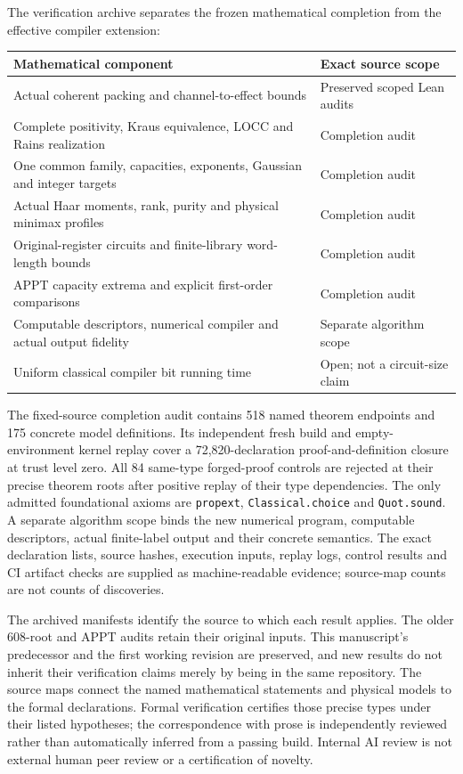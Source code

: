 The verification archive separates the frozen mathematical completion from the effective compiler extension:
\begingroup
\renewcommand{\baselinestretch}{1.0}\small
\begin{center}
\begin{tabular}{>{\raggedright\arraybackslash}p{}>{\raggedright\arraybackslash}p{}}
\toprule
Mathematical component & Exact source scope\\
\midrule
Actual coherent packing and channel-to-effect bounds & Preserved scoped Lean audits\\
Complete positivity, Kraus equivalence, LOCC and Rains realization & Completion audit\\
One common family, capacities, exponents, Gaussian and integer targets & Completion audit\\
Actual Haar moments, rank, purity and physical minimax profiles & Completion audit\\
Original-register circuits and finite-library word-length bounds & Completion audit\\
APPT capacity extrema and explicit first-order comparisons & Completion audit\\
Computable descriptors, numerical compiler and actual output fidelity & Separate algorithm scope\\
Uniform classical compiler bit running time & Open; not a circuit-size claim\\
\bottomrule
\end{tabular}
\end{center}
\endgroup
The fixed-source completion audit contains 518 named theorem endpoints and 175 concrete model definitions. Its independent fresh build and empty-environment kernel replay cover a 72,820-declaration proof-and-definition closure at trust level zero. All 84 same-type forged-proof controls are rejected at their precise theorem roots after positive replay of their type dependencies. The only admitted foundational axioms are \texttt{propext}, \texttt{Classical.choice} and \texttt{Quot.sound}. A separate algorithm scope binds the new numerical program, computable descriptors, actual finite-label output and their concrete semantics. The exact declaration lists, source hashes, execution inputs, replay logs, control results and CI artifact checks are supplied as machine-readable evidence; source-map counts are not counts of discoveries.

The archived manifests identify the source to which each result applies. The older 608-root and APPT audits retain their original inputs. This manuscript's predecessor and the first working revision are preserved, and new results do not inherit their verification claims merely by being in the same repository. The source maps connect the named mathematical statements and physical models to the formal declarations. Formal verification certifies those precise types under their listed hypotheses; the correspondence with prose is independently reviewed rather than automatically inferred from a passing build. Internal AI review is not external human peer review or a certification of novelty.

